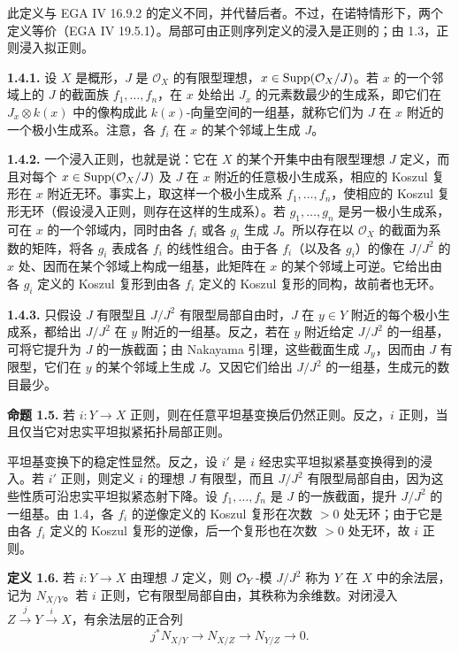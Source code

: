 此定义与 EGA IV 16.9.2 的定义不同，并代替后者。不过，在诺特情形下，两个定义等价（EGA IV 19.5.1）。局部可由正则序列定义的浸入是正则的；由 1.3，正则浸入拟正则。

\textbf{1.4.1.} 设 \(X\) 是概形，\(J\) 是 \(\mathcal O_X\) 的有限型理想，\(x\in\operatorname{Supp}(\mathcal O_X/J)\)。若 \(x\) 的一个邻域上的 \(J\) 的截面族 \(f_1,\ldots,f_n\)，在 \(x\) 处给出 \(J_x\) 的元素数最少的生成系，即它们在 \(J_x\otimes k(x)\) 中的像构成此 \(k(x)\)-向量空间的一组基，就称它们为 \(J\) 在 \(x\) 附近的一个极小生成系。注意，各 \(f_i\) 在 \(x\) 的某个邻域上生成 \(J\)。

\textbf{1.4.2.} 一个浸入正则，也就是说：它在 \(X\) 的某个开集中由有限型理想 \(J\) 定义，而且对每个 \(x\in\operatorname{Supp}(\mathcal O_X/J)\) 及 \(J\) 在 \(x\) 附近的任意极小生成系，相应的 Koszul 复形在 \(x\) 附近无环。事实上，取这样一个极小生成系 \(f_1,\ldots,f_n\)，使相应的 Koszul 复形无环（假设浸入正则，则存在这样的生成系）。若 \(g_1,\ldots,g_n\) 是另一极小生成系，可在 \(x\) 的一个邻域内，同时由各 \(f_i\) 或各 \(g_i\) 生成 \(J\)。所以存在以 \(\mathcal O_X\) 的截面为系数的矩阵，将各 \(g_i\) 表成各 \(f_i\) 的线性组合。由于各 \(f_i\)（以及各 \(g_i\)）的像在 \(J/J^2\) 的 \(x\) 处、因而在某个邻域上构成一组基，此矩阵在 \(x\) 的某个邻域上可逆。它给出由各 \(g_i\) 定义的 Koszul 复形到由各 \(f_i\) 定义的 Koszul 复形的同构，故前者也无环。

\textbf{1.4.3.} 只假设 \(J\) 有限型且 \(J/J^2\) 有限型局部自由时，\(J\) 在 \(y\in Y\) 附近的每个极小生成系，都给出 \(J/J^2\) 在 \(y\) 附近的一组基。反之，若在 \(y\) 附近给定 \(J/J^2\) 的一组基，可将它提升为 \(J\) 的一族截面；由 Nakayama 引理，这些截面生成 \(J_y\)，因而由 \(J\) 有限型，它们在 \(y\) 的某个邻域上生成 \(J\)。又因它们给出 \(J/J^2\) 的一组基，生成元的数目最少。

\textbf{命题 1.5.} 若 \(i:Y\to X\) 正则，则在任意平坦基变换后仍然正则。反之，\(i\) 正则，当且仅当它对忠实平坦拟紧拓扑局部正则。

平坦基变换下的稳定性显然。反之，设 \(i'\) 是 \(i\) 经忠实平坦拟紧基变换得到的浸入。若 \(i'\) 正则，则定义 \(i\) 的理想 \(J\) 有限型，而且 \(J/J^2\) 有限型局部自由，因为这些性质可沿忠实平坦拟紧态射下降。设 \(f_1,\ldots,f_n\) 是 \(J\) 的一族截面，提升 \(J/J^2\) 的一组基。由 1.4，各 \(f_i\) 的逆像定义的 Koszul 复形在次数 \(>0\) 处无环；由于它是由各 \(f_i\) 定义的 Koszul 复形的逆像，后一个复形也在次数 \(>0\) 处无环，故 \(i\) 正则。

\textbf{定义 1.6.} 若 \(i:Y\to X\) 由理想 \(J\) 定义，则 \(\mathcal O_Y\)-模 \(J/J^2\) 称为 \(Y\) 在 \(X\) 中的余法层，记为 \(N_{X/Y}\)。若 \(i\) 正则，它有限型局部自由，其秩称为余维数。对闭浸入 \(Z\xrightarrow{j}Y\xrightarrow{i}X\)，有余法层的正合列
\begin{equation}\tag{1.6.1}
 j^*N_{X/Y}\longrightarrow N_{X/Z}\longrightarrow N_{Y/Z}\longrightarrow0.
\end{equation}

